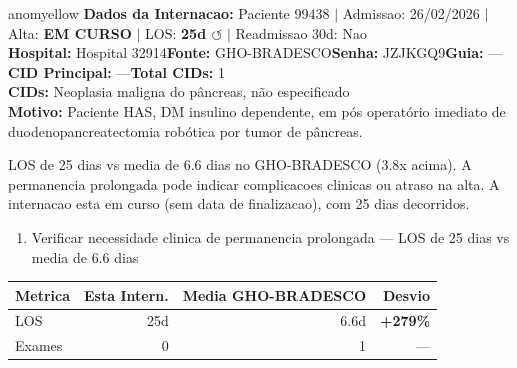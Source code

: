 \documentclass[a4paper,10pt]{article}
\begin{document}
\begin{anomalycard}[Internacao 119915 | GHO-BRADESCO | MODERADO (z=2.59)]{anomyellow}
\textbf{Dados da Internacao:} Paciente 99438 $\mid$ Admissao: 26/02/2026 $\mid$ Alta: \textcolor{anomorange}{\textbf{EM CURSO}} $\mid$ LOS: \textbf{25d \textcolor{anomorange}{$\circlearrowleft$}} $\mid$ Readmissao 30d: Nao\\
\textbf{Hospital:} Hospital 32914\quad\textbf{Fonte:} GHO-BRADESCO\quad\textbf{Senha:} JZJKGQ9\quad\textbf{Guia:} ---\\
\textbf{CID Principal:} {\small ---}\quad\textbf{Total CIDs:} 1\\

\textbf{CIDs:} {\scriptsize Neoplasia maligna do pâncreas, não especificado}\\

\textbf{Motivo:} {\scriptsize Paciente HAS, DM insulino dependente, em pós operatório imediato de duodenopancreatectomia robótica por tumor de pâncreas.}\\

\vspace{2pt}\begin{tcolorbox}[colback=severityred!20,colframe=anomyellow,title={\textbf{Interpretacao de Negocio}},fonttitle=\bfseries\small,left=4pt,right=4pt,top=3pt,bottom=3pt]
{\small LOS de 25 dias vs media de 6.6 dias no GHO-BRADESCO (3.8x acima). A permanencia prolongada pode indicar complicacoes clinicas ou atraso na alta. A internacao esta em curso (sem data de finalizacao), com 25 dias decorridos.}
\end{tcolorbox}
\begin{tcolorbox}[colback=severityyellow!30,colframe=anomorange,title={\textbf{Recomendacoes Especificas}},fonttitle=\bfseries\small,left=4pt,right=4pt,top=3pt,bottom=3pt]
\begin{enumerate}[nosep,leftmargin=16pt]
\item {\small Verificar necessidade clinica de permanencia prolongada --- LOS de 25 dias vs media de 6.6 dias}
\end{enumerate}
\end{tcolorbox}
\begin{center}\begin{tabular}{l r r r}\toprule\textbf{Metrica} & \textbf{Esta Intern.} & \textbf{Media GHO-BRADESCO} & \textbf{Desvio} \\\midrule
LOS & 25d & 6.6d & \textcolor{anomred}{\textbf{+279\%}} \\
Exames & 0 & 1 & --- \\
\bottomrule\end{tabular}\end{center}


\end{anomalycard}
\end{document}

